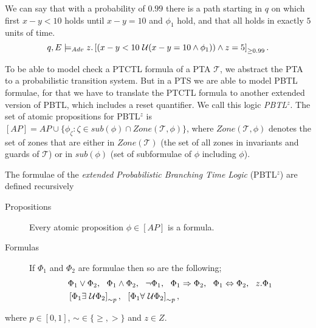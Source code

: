 \begin{ex}
\label{ex:ptctl}
We can say that with a probability of $0.99$ there is a path starting in $q$ on which first $x-y<10$ holds until $x-y=10$ and $\phi_{1}$ hold, and that all holds in exactly $5$ units of time.
\[
q,E\models_{Adv} z.\left[(x-y<10\ \mathcal{U}(x-y=10\land\phi_{1}))\land z=5\right]_{\geq0.99}.
\]
\end{ex}
To be able to model check a PTCTL formula of a PTA $\mathcal{T}$, we abstract the PTA to a probabilistic transition system. But in a PTS we are able to model PBTL formulae, for that we have to translate the PTCTL formula to another extended version of PBTL, which includes a reset quantifier. We call this logic \emph{PBTL$^{z}$}.
The set of atomic propositions for PBTL$^{z}$ is $[AP]=AP\cup\{\phi_{\zeta} : \zeta\in sub(\phi)\cap Zone(\mathcal{T},\phi)\}$, where $Zone(\mathcal{T},\phi)$ denotes the set of zones that are either in $Zone(\mathcal{T})$ (the set of all zones in invariants and guards of $\mathcal{T}$) or in $sub(\phi)$ (set of subformulae of $\phi$ including $\phi$).

\begin{defi}
The formulae of the \emph{extended Probabilistic Branching Time Logic} (PBTL$^{z}$) are defined recursively
\begin{description}
    \item[Propositions]{Every atomic proposition $\phi\in[AP]$ is a formula.}
    \item[Formulas]{If $\Phi_{1}$ and $\Phi_{2}$ are formulae then so are the following;
    \begin{align*}
    & \Phi_{1} \lor \Phi_{2},\ \ \Phi_{1} \land \Phi_{2}, \ \ \lnot \Phi_{1}, \ \ \Phi_{1} \Rightarrow \Phi_{2},\ \ \Phi_{1} \Leftrightarrow \Phi_{2},\ \ z.\Phi_{1} \\
    & \left[\Phi_{1} \exists\ \mathcal{U} \Phi_{2}\right]_{\sim p}, \ \
      \left[\Phi_{1} \forall\ \mathcal{U} \Phi_{2}\right]_{\sim p},
    \end{align*}}
\end{description}
where $p\in[0,1]$, $\sim\in\{\geq,>\}$ and $z\in Z$.
\end{defi}

